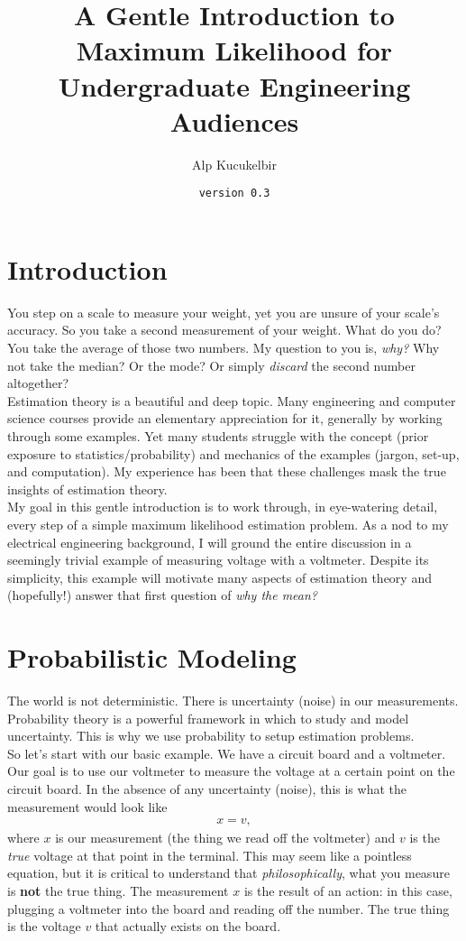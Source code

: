 \documentclass[10pt,letterpaper]{article}
\title{\textbf{A Gentle Introduction to Maximum Likelihood \break for Undergraduate Engineering Audiences}}
\author{Alp Kucukelbir}
\date{\texttt{version 0.3}}
\begin{document}
\maketitle

\section{Introduction}
You step on a scale to measure your weight, yet you are unsure of your scale's accuracy. So you take a second measurement of your weight. What do you do? You take the average of those two numbers. My question to you is, \emph{why?} Why not take the median? Or the mode? Or simply \emph{discard} the second number altogether? \\

Estimation theory is a beautiful and deep topic. Many  engineering and computer science courses provide an elementary appreciation for it, generally by working through some examples. Yet many students struggle with the concept (prior exposure to statistics/probability) and mechanics of the examples (jargon, set-up, and computation). My experience has been that these challenges mask the true insights of estimation theory.\\

My goal in this gentle introduction is to work through, in eye-watering detail, every step of a simple maximum likelihood estimation problem. As a nod to my electrical engineering background, I will ground the entire discussion in a seemingly trivial example of measuring voltage with a voltmeter. Despite its simplicity, this example will motivate many aspects of estimation theory and (hopefully!) answer that first question of \emph{why the mean?}

\section{Probabilistic Modeling}
The world is not deterministic. There is uncertainty (noise) in our measurements. Probability theory is a powerful framework in which to study and model uncertainty. This is why we use probability to setup estimation problems.\\

So let's start with our basic example. We have a circuit board and a voltmeter. Our goal is to use our voltmeter to measure the voltage at a certain point on the circuit board. In the absence of any uncertainty (noise), this is what the measurement would look like
\begin{align}
	x = v,\label{relationshipModel}
\end{align}
where $x$ is our measurement (the thing we read off the voltmeter) and $v$ is the \emph{true} voltage at that point in the terminal. This may seem like a pointless equation, but it is critical to understand that \emph{philosophically}, what you measure is \textbf{not} the true thing. The measurement $x$ is the result of an action: in this case, plugging a voltmeter into the board and reading off the number. The true thing is the voltage $v$ that actually exists on the board.\\
\end{document}
